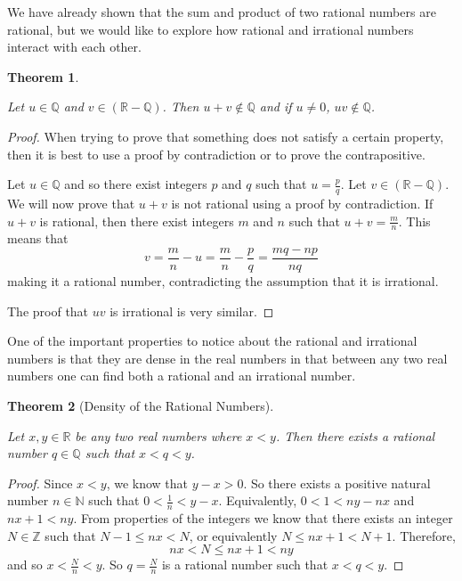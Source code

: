 \documentclass[
]{book}
\newtheorem{theorem}{Theorem}[chapter]
\theoremstyle{definition}
\theoremstyle{definition}
\theoremstyle{definition}
\theoremstyle{definition}
\theoremstyle{remark}
\begin{document}
We have already shown that the sum and product of two rational numbers are rational, but we would like to explore how rational and irrational numbers interact with each other.

\begin{theorem}
\protect\hypertarget{thm:unlabeled-div-53}{}\label{thm:unlabeled-div-53}

Let \(u\in \mathbb{Q}\) and \(v\in (\mathbb{R}-\mathbb{Q})\). Then \(u+v\notin \mathbb{Q}\) and if \(u\neq 0\), \(uv\notin \mathbb{Q}\).

\end{theorem}

\begin{proof}

When trying to prove that something does not satisfy a certain property, then it is best to use a proof by contradiction or to prove the contrapositive.

Let \(u\in \mathbb{Q}\) and so there exist integers \(p\) and \(q\) such that \(u=\frac{p}{q}\). Let \(v\in (\mathbb{R}-\mathbb{Q})\). We will now prove that \(u+v\) is not rational using a proof by contradiction. If \(u+v\) is rational, then there exist integers \(m\) and \(n\) such that \(u+v=\frac{m}{n}\). This means that \[v= \frac{m}{n}-u = \frac{m}{n}-\frac{p}{q} = \frac{mq-np}{nq}\] making it a rational number, contradicting the assumption that it is irrational.

The proof that \(uv\) is irrational is very similar.

\end{proof}

One of the important properties to notice about the rational and irrational numbers is that they are dense in the real numbers in that between any two real numbers one can find both a rational and an irrational number.

\begin{theorem}[Density of the Rational Numbers]
\protect\hypertarget{thm:unlabeled-div-55}{}\label{thm:unlabeled-div-55}

Let \(x,y\in \mathbb{R}\) be any two real numbers where \(x<y\). Then there exists a rational number \(q\in \mathbb{Q}\) such that \(x<q<y\).

\end{theorem}

\begin{proof}

Since \(x<y\), we know that \(y-x>0\). So there exists a positive natural number \(n\in \mathbb{N}\) such that \(0<\frac{1}{n}<y-x\). Equivalently, \(0<1<ny-nx\) and \(nx+1<ny\). From properties of the integers we know that there exists an integer \(N\in \mathbb{Z}\) such that \(N-1\leq nx<N\), or equivalently \(N\leq nx+1 < N+1\). Therefore, \[nx<N\leq nx+1 < ny\] and so \(x<\frac{N}{n} <y\). So \(q=\frac{N}{n}\) is a rational number such that \(x<q<y\).

\end{proof}
\end{document}
